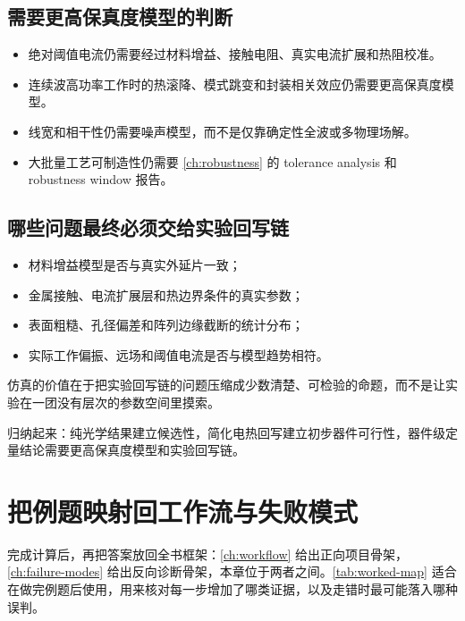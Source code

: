 \subsection*{需要更高保真度模型的判断}
\begin{itemize}
  \item 绝对阈值电流仍需要经过材料增益、接触电阻、真实电流扩展和热阻校准。
  \item 连续波高功率工作时的热滚降、模式跳变和封装相关效应仍需要更高保真度模型。
  \item 线宽和相干性仍需要噪声模型，而不是仅靠确定性全波或多物理场解。
  \item 大批量工艺可制造性仍需要 \cref{ch:robustness} 的 tolerance analysis 和 robustness window 报告。
\end{itemize}

\subsection*{哪些问题最终必须交给实验回写链}
\begin{itemize}
  \item 材料增益模型是否与真实外延片一致；
  \item 金属接触、电流扩展层和热边界条件的真实参数；
  \item 表面粗糙、孔径偏差和阵列边缘截断的统计分布；
  \item 实际工作偏振、远场和阈值电流是否与模型趋势相符。
\end{itemize}
仿真的价值在于把实验回写链的问题压缩成少数清楚、可检验的命题，而不是让实验在一团没有层次的参数空间里摸索。

归纳起来：纯光学结果建立候选性，简化电热回写建立初步器件可行性，器件级定量结论需要更高保真度模型和实验回写链。

\section{把例题映射回工作流与失败模式}
完成计算后，再把答案放回全书框架：\cref{ch:workflow} 给出正向项目骨架，\cref{ch:failure-modes} 给出反向诊断骨架，本章位于两者之间。\cref{tab:worked-map} 适合在做完例题后使用，用来核对每一步增加了哪类证据，以及走错时最可能落入哪种误判。

